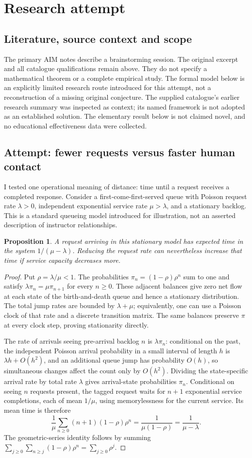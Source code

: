 \documentclass[11pt]{article}
\newtheorem{proposition}{Proposition}
\begin{document}
\section{Research attempt}
\subsection{Literature, source context and scope}
The primary AIM notes describe a brainstorming session. The original excerpt and all catalogue qualifications remain above. They do not specify a mathematical theorem or a complete empirical study. The formal model below is an explicitly limited research route introduced for this attempt, not a reconstruction of a missing original conjecture. The supplied catalogue's earlier research summary was inspected as context; its named framework is not adopted as an established solution. The elementary result below is not claimed novel, and no educational effectiveness data were collected.

\subsection{Attempt: fewer requests versus faster human contact}
I tested one operational meaning of distance: time until a request receives a completed response. Consider a first-come-first-served queue with Poisson request rate $\lambda>0$, independent exponential service rate $\mu>\lambda$, and a stationary backlog. This is a standard queueing model introduced for illustration, not an asserted description of instructor relationships.
\begin{proposition}
A request arriving in this stationary model has expected time in the system $1/(\mu-\lambda)$. Reducing the request rate can nevertheless increase that time if service capacity decreases more.
\end{proposition}
\begin{proof}
Put $\rho=\lambda/\mu<1$. The probabilities $\pi_n=(1-\rho)\rho^n$ sum to one and satisfy $\lambda\pi_n=\mu\pi_{n+1}$ for every $n\ge0$. These adjacent balances give zero net flow at each state of the birth-and-death queue and hence a stationary distribution. The total jump rates are bounded by $\lambda+\mu$; equivalently, one can use a Poisson clock of that rate and a discrete transition matrix. The same balances preserve $\pi$ at every clock step, proving stationarity directly.

The rate of arrivals seeing pre-arrival backlog $n$ is $\lambda\pi_n$: conditional on the past, the independent Poisson arrival probability in a small interval of length $h$ is $\lambda h+O(h^2)$, and an additional queue jump has probability $O(h)$, so simultaneous changes affect the count only by $O(h^2)$. Dividing the state-specific arrival rate by total rate $\lambda$ gives arrival-state probabilities $\pi_n$. Conditional on seeing $n$ requests present, the tagged request waits for $n+1$ exponential service completions, each of mean $1/\mu$, using memorylessness for the current service. Its mean time is therefore
\[
\frac1\mu\sum_{n\ge0}(n+1)(1-\rho)\rho^n
=\frac1{\mu(1-\rho)}=\frac1{\mu-\lambda}.
\]
The geometric-series identity follows by summing $\sum_{j\ge0}\sum_{n\ge j}(1-\rho)\rho^n=\sum_{j\ge0}\rho^j$.
\end{proof}
\end{document}
